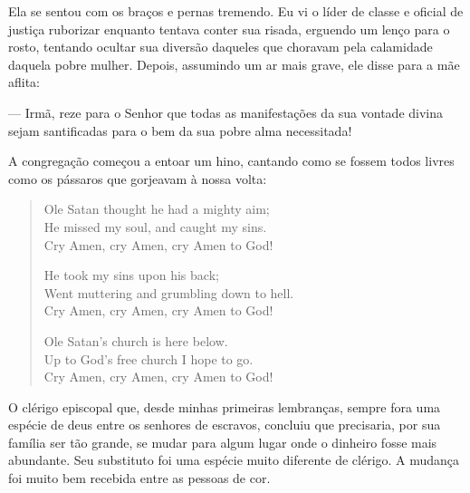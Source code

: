 Ela se sentou com os braços e pernas
tremendo. Eu vi o líder de classe e oficial de justiça ruborizar
enquanto tentava conter sua risada, erguendo um lenço para o rosto,
tentando ocultar sua diversão daqueles que choravam pela calamidade
daquela pobre mulher. Depois, assumindo um ar mais grave, ele disse para
a mãe aflita:

--- Irmã, reze para o Senhor que todas as manifestações da sua vontade
divina sejam santificadas para o bem da sua pobre alma necessitada!

A congregação começou a entoar um hino,
cantando como se fossem todos livres como os pássaros que gorjeavam à
nossa volta:

\begin{verse}
Ole Satan thought he had a mighty aim;\\
He missed my soul, and caught my sins.\\
Cry Amen, cry Amen, cry Amen to God! 

He took my sins upon his back;\\
Went muttering and grumbling down to hell.\\
Cry Amen, cry Amen, cry Amen to God! 

Ole Satan's church is here below.\\
Up to God's free church I hope to go.\\
Cry Amen, cry Amen, cry Amen to God!\footnotemark
\end{verse}


O clérigo episcopal que, desde minhas
primeiras lembranças, sempre fora uma espécie de deus entre os senhores
de escravos, concluiu que precisaria, por sua família ser tão grande, se
mudar para algum lugar onde o dinheiro fosse mais abundante. Seu
substituto foi uma espécie muito diferente de clérigo. A mudança foi
muito bem recebida entre as pessoas de cor.

